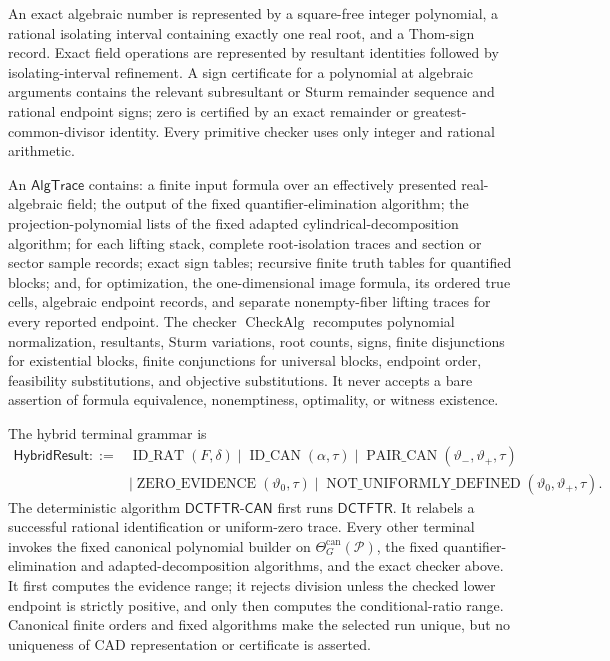 An exact algebraic number is represented by a square-free integer polynomial, a rational isolating interval containing exactly one real root, and a Thom-sign record.  Exact field operations are represented by resultant identities followed by isolating-interval refinement.  A sign certificate for a polynomial at algebraic arguments contains the relevant subresultant or Sturm remainder sequence and rational endpoint signs; zero is certified by an exact remainder or greatest-common-divisor identity.  Every primitive checker uses only integer and rational arithmetic.

An \(\mathsf{AlgTrace}\) contains: a finite input formula over an effectively presented real-algebraic field; the output of the fixed quantifier-elimination algorithm; the projection-polynomial lists of the fixed adapted cylindrical-decomposition algorithm; for each lifting stack, complete root-isolation traces and section or sector sample records; exact sign tables; recursive finite truth tables for quantified blocks; and, for optimization, the one-dimensional image formula, its ordered true cells, algebraic endpoint records, and separate nonempty-fiber lifting traces for every reported endpoint.  The checker \(\operatorname{CheckAlg}\) recomputes polynomial normalization, resultants, Sturm variations, root counts, signs, finite disjunctions for existential blocks, finite conjunctions for universal blocks, endpoint order, feasibility substitutions, and objective substitutions.  It never accepts a bare assertion of formula equivalence, nonemptiness, optimality, or witness existence.

The hybrid terminal grammar is
\[
\begin{split}
\mathsf{HybridResult}::={}&
\operatorname{ID\_RAT}(F,\delta)
\mid\operatorname{ID\_CAN}(\alpha,\tau)
\mid\operatorname{PAIR\_CAN}(\vartheta_-,\vartheta_+,\tau)\\
&\mid\operatorname{ZERO\_EVIDENCE}(\vartheta_0,\tau)
\mid\operatorname{NOT\_UNIFORMLY\_DEFINED}(\vartheta_0,\vartheta_+,\tau).
\end{split}
\]
The deterministic algorithm \(\mathsf{DCTFTR\text{-}CAN}\) first runs \(\mathsf{DCTFTR}\).  It relabels a successful rational identification or uniform-zero trace.  Every other terminal invokes the fixed canonical polynomial builder on \(\Theta_G^{\mathrm{can}}(\mathcal P)\), the fixed quantifier-elimination and adapted-decomposition algorithms, and the exact checker above.  It first computes the evidence range; it rejects division unless the checked lower endpoint is strictly positive, and only then computes the conditional-ratio range.  Canonical finite orders and fixed algorithms make the selected run unique, but no uniqueness of CAD representation or certificate is asserted.